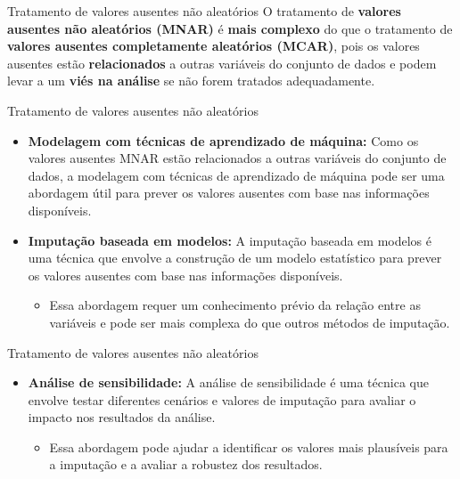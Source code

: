 \documentclass[
  ignorenonframetext,
  aspectratio=169,
]{beamer}
\providecommand{\tightlist}{%
  \setlength{\itemsep}{0pt}\setlength{\parskip}{0pt}}
\begin{document}
\begin{frame}{Tratamento de valores ausentes não aleatórios}
\label{tratamento-de-valores-ausentes-nuxe3o-aleatuxf3rios}
O tratamento de \textbf{valores ausentes não aleatórios (MNAR)} é
\textbf{mais complexo} do que o tratamento de \textbf{valores ausentes
completamente aleatórios (MCAR)}, pois os valores ausentes estão
\textbf{relacionados} a outras variáveis do conjunto de dados e podem
levar a um \textbf{viés na análise} se não forem tratados adequadamente.
\end{frame}

\begin{frame}{Tratamento de valores ausentes não aleatórios}
\label{tratamento-de-valores-ausentes-nuxe3o-aleatuxf3rios-1}
\begin{itemize}
\tightlist
\item
  \textbf{Modelagem com técnicas de aprendizado de máquina:} Como os
  valores ausentes MNAR estão relacionados a outras variáveis do
  conjunto de dados, a modelagem com técnicas de aprendizado de máquina
  pode ser uma abordagem útil para prever os valores ausentes com base
  nas informações disponíveis.
\end{itemize}

\pause

\begin{itemize}
\item
  \textbf{Imputação baseada em modelos:} A imputação baseada em modelos
  é uma técnica que envolve a construção de um modelo estatístico para
  prever os valores ausentes com base nas informações disponíveis.

  \begin{itemize}
  \tightlist
  \item
    Essa abordagem requer um conhecimento prévio da relação entre as
    variáveis e pode ser mais complexa do que outros métodos de
    imputação.
  \end{itemize}
\end{itemize}
\end{frame}

\begin{frame}{Tratamento de valores ausentes não aleatórios}
\label{tratamento-de-valores-ausentes-nuxe3o-aleatuxf3rios-2}
\begin{itemize}
\item
  \textbf{Análise de sensibilidade:} A análise de sensibilidade é uma
  técnica que envolve testar diferentes cenários e valores de imputação
  para avaliar o impacto nos resultados da análise.

  \begin{itemize}
  \tightlist
  \item
    Essa abordagem pode ajudar a identificar os valores mais plausíveis
    para a imputação e a avaliar a robustez dos resultados.
  \end{itemize}
\end{itemize}
\end{frame}
\end{document}
